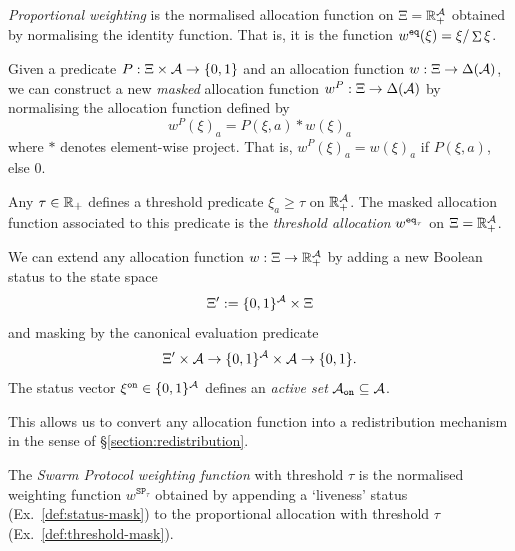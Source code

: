 \begin{example}

  \emph{Proportional weighting} is the normalised allocation function on $\Xi=\mathbb{R}_+^{\mathcal{A}}$ obtained by normalising the identity function.
  That is, it is the function $w^{\mathtt{eq}}(\xi) = \xi/\mathop{\Sigma} \xi$.

\end{example}

\begin{definition}[Masking]

  Given a predicate $P:\Xi\times\mathcal{A}\rightarrow\{0,1\}$ and an allocation function $w:\Xi\rightarrow\Delta(\mathcal{A})$, we can construct a new \emph{masked} allocation function $w^P:\Xi\rightarrow\Delta(\mathcal{A})$ by normalising the allocation function defined by
  \[
    w^P(\xi)_a = P(\xi,a) * w(\xi)_a
  \]
  where $*$ denotes element-wise project.
  That is, $w^P(\xi)_a = w(\xi)_a$ if $P(\xi,a)$, else $0$.

\end{definition}

\begin{example}
  \label{def:threshold-mask}

  Any $\tau\in\mathbb{R}_+$ defines a threshold predicate $\xi_a\geq \tau$ on $\mathbb{R}_+^{\mathcal{A}}$.
  The masked allocation function associated to this predicate is the \emph{threshold allocation} $w^{\mathtt{eq}_\tau}$ on $\Xi=\mathbb{R}_+^{\mathcal{A}}$.

\end{example}

\begin{example}[Liveness]
  \label{def:status-mask}

  We can extend any allocation function $w:\Xi\rightarrow\mathbb{R}_+^{\mathcal{A}}$ by adding a new Boolean status to the state space
  \[
    \Xi' := \{0,1\}^{\mathcal{A}}\times \Xi
  \]
  and masking by the canonical evaluation predicate 
  \[
    \Xi'\times\mathcal{A}\rightarrow  \{0,1\}^{\mathcal{A}} \times\mathcal{A}\rightarrow\{0,1\}.
  \]
  The status vector $\xi^{\mathtt{on}}\in\{0,1\}^{\mathcal{A}}$ defines an \emph{active set} $\mathcal{A}_{\mathtt{on}}\subseteq\mathcal{A}$.

  This allows us to convert any allocation function into a redistribution mechanism in the sense of \S\ref{section:redistribution}.

\end{example}

\begin{definition}
  \label{def:sp-weight}

  The \emph{Swarm Protocol weighting function} with threshold $\tau$ is the normalised weighting function $w^{\mathtt{SP}_\tau}$ obtained by appending a `liveness' status (Ex.~\ref{def:status-mask}) to the proportional allocation with threshold $\tau$ (Ex.~\ref{def:threshold-mask}).

\end{definition}

